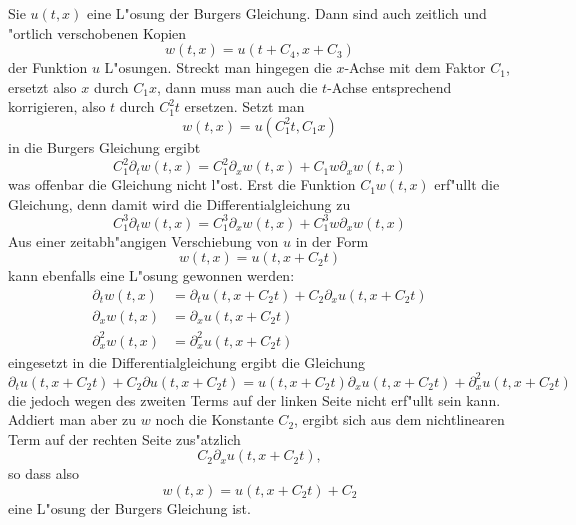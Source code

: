 Sie $u(t,x)$ eine L"osung der Burgers Gleichung. Dann sind auch
zeitlich und "ortlich verschobenen Kopien
\[
w(t,x)=u(t+C_4, x+C_3)
\]
der Funktion $u$ L"osungen.
Streckt man hingegen die $x$-Achse mit dem Faktor $C_1$, ersetzt
also $x$ durch $C_1x$, dann
muss man auch die $t$-Achse entsprechend korrigieren, also $t$
durch $C_1^2t$ ersetzen. Setzt man
\[
w(t,x)=u(C_1^2t,C_1x)
\]
in die Burgers Gleichung ergibt
\[
C_1^2\partial_t w(t,x)=C_1^2\partial_xw(t,x)+C_1w\partial_xw(t,x)
\]
was offenbar die Gleichung nicht l"ost. Erst die Funktion $C_1w(t,x)$
erf"ullt die Gleichung, denn damit wird die Differentialgleichung zu
\[
C_1^3\partial_t w(t,x)=C_1^3\partial_xw(t,x)+C_1^3w\partial_xw(t,x)
\]
Aus einer zeitabh"angigen Verschiebung von $u$ in der Form
\[
w(t,x)=u(t,x+C_2t)
\]
kann ebenfalls eine L"osung gewonnen werden:
\begin{align*}
\partial_t w(t,x)&=\partial_t u(t,x+C_2t)+C_2\partial_x u(t,x+C_2t)
\\
\partial_x w(t,x)&=\partial_x u(t,x+C_2t)
\\
\partial_x^2 w(t,x)&=\partial_x^2 u(t,x+C_2t)
\end{align*}
eingesetzt in die Differentialgleichung ergibt die Gleichung
\[
\partial_t u(t,x+C_2t)+C_2\partial u(t,x+C_2t)
=
u(t,x+C_2t)\partial_xu(t,x+C_2t)
+
\partial_x^2 u(t,x+C_2t)
\]
die jedoch wegen des zweiten Terms auf der linken Seite nicht erf"ullt
sein kann. Addiert man aber zu $w$ noch die Konstante $C_2$, ergibt sich
aus dem nichtlinearen Term auf der rechten Seite zus"atzlich
\[
C_2\partial_xu(t,x+C_2t),
\]
so dass also
\[
w(t,x)=u(t,x+C_2t)+C_2
\]
eine L"osung der Burgers Gleichung ist.

